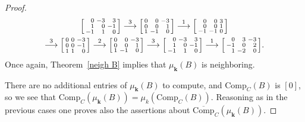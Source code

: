 \documentclass[10pt]{article}
\theoremstyle{definition}
\theoremstyle{remark}
\numberwithin{equation}{section}
\newcommand{\0}{{\mathbf{0}}}
\newcommand{\Comp}{\mathrm{Comp}_C}
\newcommand{\CompPlus}{\overline{\mathrm{Comp}}_C}
\newcommand{\kk}{{\boldsymbol{k}}}
\begin{document}
\begin{proof}
\begin{multline*}
\begin{bsmallmatrix*}[r]
0&-3&3\\
1&0&-1\\
-1&1&0
\end{bsmallmatrix*}
\overset{3}{\longrightarrow}
\begin{bsmallmatrix*}[r]
0&0&-3\\
0&0&1\\
1&-1&0
\end{bsmallmatrix*}
\overset{1}{\longrightarrow}
\begin{bsmallmatrix*}[r]
0&0&3\\
0&0&1\\
-1&-1&0
\end{bsmallmatrix*}\\
\overset{3}{\longrightarrow}
\begin{bsmallmatrix*}[r]
0&0&-3\\
0&0&-1\\
1&1&0
\end{bsmallmatrix*}
\overset{2}{\longrightarrow}
\begin{bsmallmatrix*}[r]
0&0&-3\\
0&0&1\\
1&-1&0
\end{bsmallmatrix*}
\overset{3}{\longrightarrow}
\begin{bsmallmatrix*}[r]
0&-3&3\\
1&0&-1\\
-1&1&0
\end{bsmallmatrix*}
\overset{1}{\longrightarrow}
\begin{bsmallmatrix*}[r]
0&3&-3\\
-1&0&2\\
1&-2&0
\end{bsmallmatrix*}.
\end{multline*}
Once again, Theorem~\ref{neigh B} implies that $\mu_\kk(B)$ is neighboring.

There are no additional entries of $\mu_\kk(B)$ to compute, and $\Comp(B)$ is $[0]$, so we see that $\Comp(\mu_\kk(B))=\mu_k(\Comp(B))$.
Reasoning as in the previous cases one proves also the assertions about $\CompPlus(\mu_\kk(B))$.


\end{proof}
\end{document}
